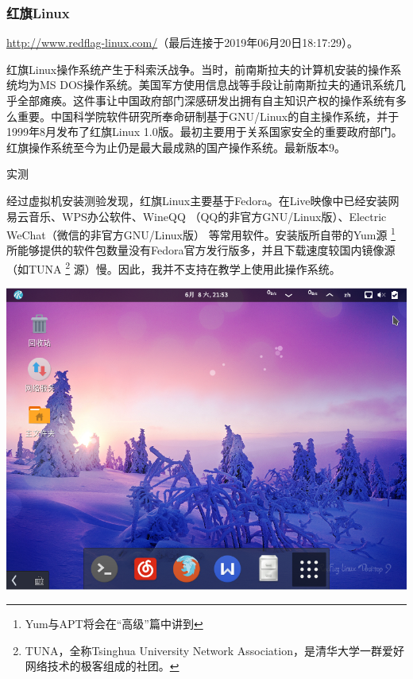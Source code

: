 \documentclass{book}
\begin{document}
\subsubsection{红旗Linux}
\url{http://www.redflag-linux.com/}（最后连接于2019年06月20日18:17:29）。 \par
红旗Linux操作系统产生于科索沃战争。当时，前南斯拉夫的计算机安装的操作系统均为MS DOS操作系统。美国军方使用信息战等手段让前南斯拉夫的通讯系统几乎全部瘫痪。这件事让中国政府部门深感研发出拥有自主知识产权的操作系统有多么重要。中国科学院软件研究所奉命研制基于GNU/Linux的自主操作系统，并于1999年8月发布了红旗Linux 1.0版。最初主要用于关系国家安全的重要政府部门。红旗操作系统至今为止仍是最大最成熟的国产操作系统。最新版本9。 \cite{rflinux} \par
\large 实测\par
\normalsize  经过虚拟机安装测验发现，红旗Linux主要基于Fedora。在Live映像中已经安装网易云音乐、WPS办公软件、WineQQ （QQ的非官方GNU/Linux版）、Electric WeChat（微信的非官方GNU/Linux版） 等常用软件。安装版所自带的Yum源 \footnote{Yum与APT将会在“高级”篇中讲到} 所能够提供的软件包数量没有Fedora官方发行版多，并且下载速度较国内镜像源（如TUNA \footnote{TUNA，全称Tsinghua University Network Association，是清华大学一群爱好网络技术的极客组成的社团。} 源）慢。因此，我并不支持在教学上使用此操作系统。
\begin{center}
	\includegraphics[scale=0.5]{pic/redflag}
\end{center}
\end{document}
